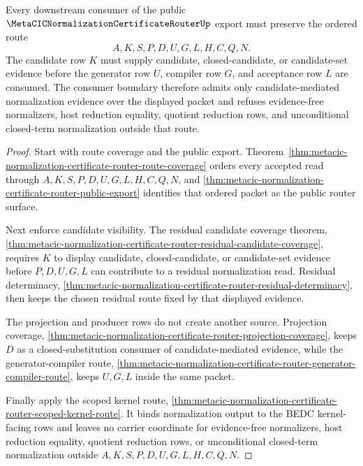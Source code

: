 \begin{theorem}
\label{thm:metacic-normalization-certificate-router-public-consumer-boundary}
Every downstream consumer of the public $\MetaCICNormalizationCertificateRouterUp$ export must preserve the ordered route
$$
A,K,S,P,D,U,G,L,H,C,Q,N .
$$
The candidate row $K$ must supply candidate, closed-candidate, or candidate-set evidence before the generator row $U$, compiler row $G$, and acceptance row $L$ are consumed. The consumer boundary therefore admits only candidate-mediated normalization evidence over the displayed packet and refuses evidence-free normalizers, host reduction equality, quotient reduction rows, and unconditional closed-term normalization outside that route.
\end{theorem}
\begin{proof}
Start with route coverage and the public export. Theorem~\ref{thm:metacic-normalization-certificate-router-route-coverage} orders every accepted read through $A,K,S,P,D,U,G,L,H,C,Q,N$, and \autoref{thm:metacic-normalization-certificate-router-public-export} identifies that ordered packet as the public router surface.

Next enforce candidate visibility. The residual candidate coverage theorem, \autoref{thm:metacic-normalization-certificate-router-residual-candidate-coverage}, requires $K$ to display candidate, closed-candidate, or candidate-set evidence before $P,D,U,G,L$ can contribute to a residual normalization read. Residual determinacy, \autoref{thm:metacic-normalization-certificate-router-residual-determinacy}, then keeps the chosen residual route fixed by that displayed evidence.

The projection and producer rows do not create another source. Projection coverage, \autoref{thm:metacic-normalization-certificate-router-projection-coverage}, keeps $D$ as a closed-substitution consumer of candidate-mediated evidence, while the generator-compiler route, \autoref{thm:metacic-normalization-certificate-router-generator-compiler-route}, keeps $U,G,L$ inside the same packet.

Finally apply the scoped kernel route, \autoref{thm:metacic-normalization-certificate-router-scoped-kernel-route}. It binds normalization output to the BEDC kernel-facing rows and leaves no carrier coordinate for evidence-free normalizers, host reduction equality, quotient reduction rows, or unconditional closed-term normalization outside $A,K,S,P,D,U,G,L,H,C,Q,N$.
\end{proof}

